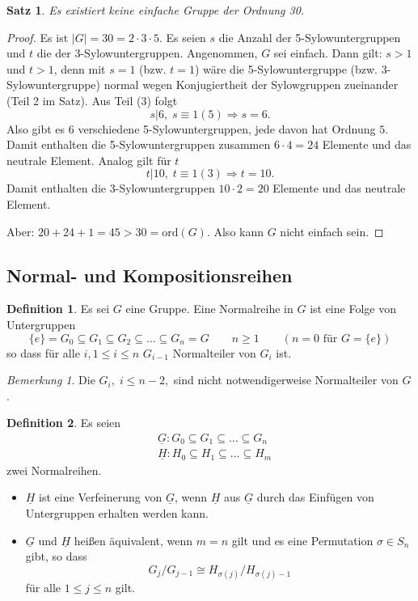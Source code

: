 \documentclass[12pt]{scrartcl}%
\newtheorem{thm}{Satz}
\theoremstyle{definition}
\newtheorem*{defn}{Definition}
\theoremstyle{remark}
\newtheorem*{nb}{Bemerkung}
\begin{document}
\begin{thm}
    Es existiert keine einfache Gruppe der Ordnung 30.
\end{thm}

\begin{proof}
    Es ist $|G| = 30 = 2\cdot 3\cdot 5$. Es seien $s$ die Anzahl der 5-Sylowuntergruppen und $t$ die der 3-Sylowuntergruppen. Angenommen, $G$ sei einfach. Dann gilt: $s>1$ und $t>1$, denn mit $s=1$ (bzw. $t=1$) wäre die 5-Sylowuntergruppe (bzw. 3-Sylowuntergruppe) normal wegen Konjugiertheit der Sylowgruppen zueinander (Teil 2 im Satz). Aus Teil (3) folgt
        \[ s|6,\; s\equiv 1(5)\Rightarrow s=6.\]
    Also gibt es 6 verschiedene 5-Sylowuntergruppen, jede davon hat Ordnung $5$. Damit enthalten die 5-Sylowuntergruppen zusammen $6\cdot 4 =24$ Elemente und das neutrale Element. Analog gilt für $t$
        \[ t|10,\; t\equiv 1(3) \Rightarrow t=10.\]
    Damit enthalten die 3-Sylowuntergruppen $10\cdot 2=20$ Elemente und das neutrale Element.
    
    Aber: $20+24+1=45>30=\text{ord}(G)$. Also kann $G$ nicht einfach sein.
\end{proof}

\subsection{Normal- und Kompositionsreihen}

\begin{defn}
    Es sei $G$ eine Gruppe. Eine Normalreihe in $G$ ist eine Folge von Untergruppen
        \[ \{e\} = G_0 \subseteq G_1 \subseteq G_2 \subseteq\dots\subseteq G_n=G\qquad n\geq 1\qquad(n=0\text{ für } G=\{e\})\]
    so dass für alle $i,1\leq i\leq n$ $G_{i-1}$ Normalteiler von $G_i$ ist.
\end{defn}

\begin{nb}
    Die $G_i,\;i\leq n-2,$ sind nicht notwendigerweise Normalteiler von $G$.
\end{nb}

\begin{defn}
    Es seien 
        \[\begin{split}
            &\underline{G}: G_0\subseteq G_1 \subseteq\dots\subseteq G_n \\
            &\underline{H}: H_0\subseteq H_1\subseteq\dots\subseteq H_m 
        \end{split}\]
    zwei Normalreihen.
    \begin{itemize}
        \item $\underline{H}$ ist eine Verfeinerung von $\underline{G}$, wenn $\underline{H}$ aus $\underline{G}$ durch das Einfügen von Untergruppen erhalten werden kann.
        \item $\underline{G}$ und $\underline{H}$ heißen äquivalent, wenn $m=n$ gilt und es eine Permutation $\sigma\in S_n$ gibt, so dass 
        \[ G_j/G_{j-1}\cong H_{\sigma(j)}/H_{\sigma(j)-1}\]
            für alle $1\leq j\leq n$ gilt.
    \end{itemize}
\end{defn}
\end{document}
